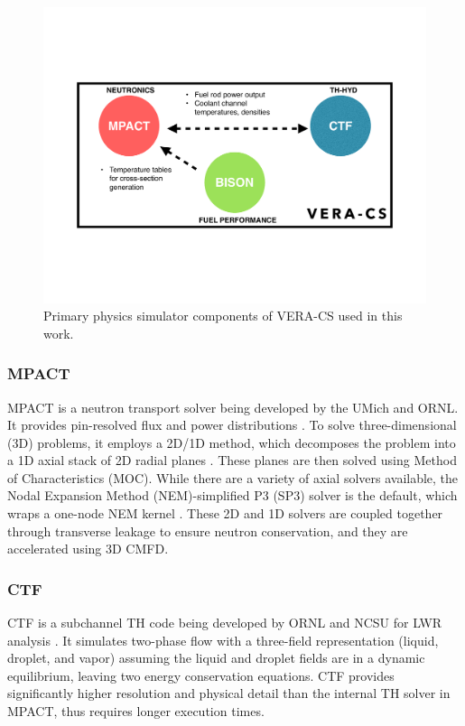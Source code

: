 \documentclass[edeposit,fullpage,11pt]{uiucthesis2009}
\begin{document}
\begin{figure}
\begin{center}
\includegraphics[width=0.5\linewidth,trim={2cm 5cm 2cm 5cm}]{./Figures/VERA-CS-Figure.pdf}
\end{center}
\caption{Primary physics simulator components of VERA-CS used in this work.}
\label{fig:workflow}
\end{figure} 

\subsubsection{MPACT}
MPACT is a neutron transport solver being developed by the \gls{UMich} and \gls{ORNL}. 
It provides pin-resolved flux and power distributions \cite{kochunas_overview_2013}. 
To solve three-dimensional (3D) problems, it employs a 2D/1D method, which decomposes the problem into a 1D axial stack of 2D radial planes \cite{zhu_assessment_2014}. 
These planes are then solved using Method of Characteristics (MOC). 
While there are a variety of axial solvers available, the Nodal Expansion Method (NEM)-simplified P3 (SP3) solver is the default, which wraps a one-node NEM kernel \cite{stimpson_axial_2014}. 
These 2D and 1D solvers are coupled together through transverse leakage to ensure neutron conservation, and they are accelerated using 3D \gls{CMFD}. 

\subsubsection{CTF}
CTF is a subchannel TH code being developed by \gls{ORNL} and \gls{NCSU} for LWR analysis \cite{avramova_ctf:_2009}. 
It simulates two-phase flow with a three-field representation (liquid, droplet, and vapor) assuming the liquid and droplet fields are in a dynamic equilibrium, leaving two energy conservation equations. 
CTF provides significantly higher resolution and physical detail than the internal TH solver in MPACT, thus requires longer execution times. 
\end{document}
